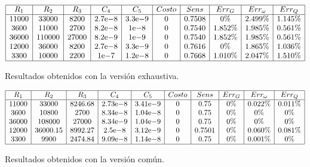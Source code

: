\documentclass{llncs}
\newcommand{\expnumber}[2]{{#1}\mathrm{e}{#2}}
\begin{document}
	\begin{table}[!h]
		$$
		\begin{array}{|c|c|c|c|c|c|c|c|c|c|}
		\hline
		R_1 & R_2 & R_3 & C_4 & C_5 & Costo  & Sens & Err_G & Err_\omega & Err_Q \\
		\hline
		11000 & 33000 & 8200 & \expnumber{2.7}{-8} & \expnumber{3.3}{-9} & 0 & 0.7508 & 0\% & 2.499\% & 1.145\% \\
		3600 & 11000 & 2700 & \expnumber{8.2}{-8} & \expnumber{1}{-8} & 0 & 0.7540 & 1.852\% & 1.985\% & 0.561\% \\
		36000 & 110000 & 27000 & \expnumber{8.2}{-9} & \expnumber{1}{-9} & 0 & 0.7540 & 1.852\% & 1.985\% & 0.561\% \\
		12000 & 36000 & 8200 & \expnumber{2.7}{-8} & \expnumber{3.3}{-9} & 0 & 0.7616 & 0\% & 1.865\% & 1.036\% \\
		3300 & 10000 & 2200 & \expnumber{1}{-7} & \expnumber{1.2}{-8} & 0 & 0.7668 & 1.010\% & 2.047\% & 1.510\% \\
		\hline
		\end{array}
		$$
		\caption{Resultados obtenidos con la versión exhaustiva.}
		\label{cuadroSolsExh}
	\end{table}

	\begin{table}[!h]
		$$
		\begin{array}{|c|c|c|c|c|c|c|c|c|c|}
		\hline
		R_1 & R_2 & R_3 & C_4 & C_5 & Costo  & Sens & Err_G & Err_\omega & Err_Q \\
		\hline
		11000 & 33000 & 8246.68 & \expnumber{2.73}{-8} & \expnumber{3.41}{-9} & 0 & 0.75 & 0\% & 0.022\% & 0.011\% \\
		3600 & 10800 & 2700 & \expnumber{8.34}{-8} & \expnumber{1.04}{-8} & 0 & 0.75 & 0\% & 0\% & 0\% \\
		36000 & 108000 & 27000 & \expnumber{8.34}{-9} & \expnumber{1.04}{-9} & 0 & 0.75 & 0\% & 0\% & 0\% \\
		12000 & 36000.15 & 8992.27 & \expnumber{2.5}{-8} & \expnumber{3.12}{-9} & 0 & 0.7501 & 0\% & 0.060\% & 0.081\% \\
		3300 & 9900 & 2474.84 & \expnumber{9.09}{-8} & \expnumber{1.14}{-8} & 0 & 0.75 & 0\% & 0.001\% & 0\% \\
		\hline
		\end{array}
		$$
		\caption{Resultados obtenidos con la versión común.}
		\label{cuadroSolsCom}
	\end{table}
\end{document}
